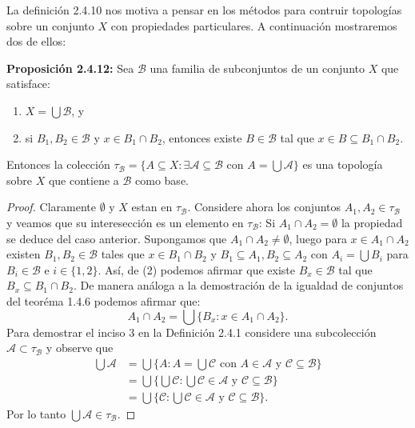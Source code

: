 La definición 2.4.10 nos motiva a pensar en los métodos para contruir topologías sobre un conjunto $X$ con propiedades particulares. A continuación mostraremos dos de ellos:

\textbf{Proposición 2.4.12:} Sea $\mathcal{B}$ una familia de subconjuntos de un conjunto $X$ que satisface:
\begin{enumerate}
    \item $X=\bigcup \mathcal{B}$, y 
    \item si $B_1,B_2\in\mathcal{B}$ y $x\in B_1\cap B_2$, entonces existe $B\in\mathcal{B}$ tal que $x\in B\subseteq B_1\cap B_2$.
\end{enumerate}
Entonces la colección $\tau_\mathcal{B}=\{A\subseteq X:\exists\mathcal{A}\subseteq\mathcal{B}\text{ con }A=\bigcup\mathcal{A}\}$ es una topología sobre $X$ que contiene a $\mathcal{B}$ como base.
\begin{proof}
Claramente $\emptyset$ y $X$ estan en $\tau_\mathcal{B}$. Considere ahora los conjuntos $A_1,A_2\in\tau_\mathcal{B}$ y veamos que su interesección es un elemento en $\tau_\mathcal{B}$: Si $A_1\cap A_2=\emptyset$ la propiedad se deduce del caso anterior. Supongamos que $A_1\cap A_2\neq\emptyset$, luego para $x\in A_1\cap A_2$ existen $B_1,B_2\in\mathcal{B}$ tales que $x\in B_1\cap B_2$ y $B_1\subseteq A_1, B_2\subseteq A_2$ con $A_i=\bigcup B_i$ para $B_i\in\mathcal{B}$ e $i\in\{1,2\}$. Así, de (2) podemos afirmar que existe $B_x\in\mathcal{B}$ tal que $B_x\subseteq B_1\cap B_2$. De manera análoga a la demostración de la igualdad de conjuntos del teoréma 1.4.6 podemos afirmar que: 
$$A_1\cap A_2=\bigcup\{B_x:x\in A_1\cap A_2\}.$$
Para demostrar el inciso 3 en la Definición 2.4.1 considere una subcolección $\mathcal{A}\subset\tau_\mathcal{B}$ y observe que
\begin{align*}
    \bigcup\mathcal{A} &= \bigcup\{A:A=\bigcup\mathcal{C}\text{ con }A\in\mathcal{A}\text{ y }\mathcal{C}\subseteq\mathcal{B}\}\\
    &= \bigcup\{\bigcup\mathcal{C}:\bigcup\mathcal{C}\in\mathcal{A}\text{ y }\mathcal{C}\subseteq\mathcal{B}\}\\
    &= \bigcup\{\mathcal{C}:\bigcup\mathcal{C}\in\mathcal{A}\text{ y }\mathcal{C}\subseteq\mathcal{B}\}.
\end{align*}
Por lo tanto $\bigcup\mathcal{A}\in\tau_\mathcal{B}$.
\end{proof}

